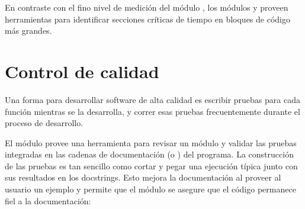 \documentclass[a4,10pt,spanish]{sphinxmanual}
\begin{document}
\begin{sphinxVerbatim}[commandchars=\\\{\}]
   
 
 
\end{sphinxVerbatim}

\sphinxAtStartPar
En contraste con el fino nivel de medición del módulo , los módulos  y  proveen herramientas para identificar secciones críticas de tiempo en bloques de código más grandes.


\section{Control de calidad}
\label{\detokenize{tutorial/stdlib:quality-control}}\label{\detokenize{tutorial/stdlib:tut-quality-control}}
\sphinxAtStartPar
Una forma para desarrollar software de alta calidad es escribir pruebas para cada función mientras se la desarrolla, y correr esas pruebas frecuentemente durante el proceso de desarrollo.

\sphinxAtStartPar
El módulo  provee una herramienta para revisar un módulo y validar las pruebas integradas en las cadenas de documentación (o ) del programa.  La construcción de las pruebas es tan sencillo como cortar y pegar una ejecución típica junto con sus resultados en los docstrings.  Esto mejora la documentación al proveer al usuario un ejemplo y permite que el módulo  se asegure que el código permanece fiel a la documentación:

\begin{sphinxVerbatim}[commandchars=\\\{\}]
 

       

 
   
\end{sphinxVerbatim}
\end{document}
